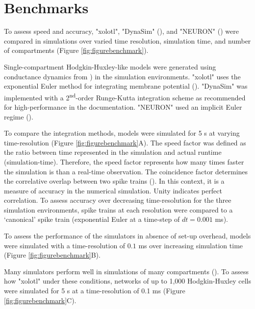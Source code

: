 \documentclass{frontiersSCNS} %
\begin{document}
\section{Benchmarks}
\label{benchmarks}

To assess speed and accuracy, "xolotl", "DynaSim" (\cite{sherfeyDynaSimMATLABToolbox2018}), and "NEURON" (\cite{hinesNEURONSimulationEnvironment1997}) were compared in simulations over varied time resolution,  simulation time, and number of compartments (Figure \ref{fig:figurebenchmark}).

Single-compartment Hodgkin-Huxley-like models were generated using conductance dynamics from \cite{liuModelNeuronActivitydependent1998}) in the simulation environments. "xolotl" uses the exponential Euler method for integrating membrane potential (\cite{dayanTheoreticalNeuroscience2001}). "DynaSim" was implemented with a 2\textsuperscript{nd}-order Runge-Kutta integration scheme as recommended for high-performance in the documentation. "NEURON" used an implicit Euler regime (\cite{hinesNEURONSimulationEnvironment1997}).

To compare the integration methods, models were simulated for 5 s at varying time-resolution (Figure \ref{fig:figurebenchmark}A). The speed factor was defined as the ratio between time represented in the simulation and actual runtime (simulation-time). Therefore, the speed factor represents how many times faster the simulation is than a real-time observation. The coincidence factor determines the correlative overlap between two spike trains (\cite{jolivetBenchmarkTestQuantitative2008}). In this context, it is a measure of accuracy in the numerical simulation. Unity indicates perfect correlation. To assess accuracy over decreasing time-resolution for the three simulation environments, spike trains at each resolution were compared to a `canonical' spike train (exponential Euler at a time-step of $dt = 0.001$ ms). 

To assess the performance of the simulators in absence of set-up overhead, models were simulated with a time-resolution of $0.1$ ms over increasing simulation time (Figure \ref{fig:figurebenchmark}B).

Many simulators perform well in simulations of many compartments (\cite{bretteSimulationNetworksSpiking2007, sherfeyDynaSimMATLABToolbox2018, vitayANNarchyCodeGeneration2015, delormeSpikeNETEventdrivenSimulation2003}). To assess how "xolotl" under these conditions, networks of up to 1,000 Hodgkin-Huxley cells were simulated for 5 s at a time-resolution of 0.1 ms (Figure \ref{fig:figurebenchmark}C).
\end{document}
